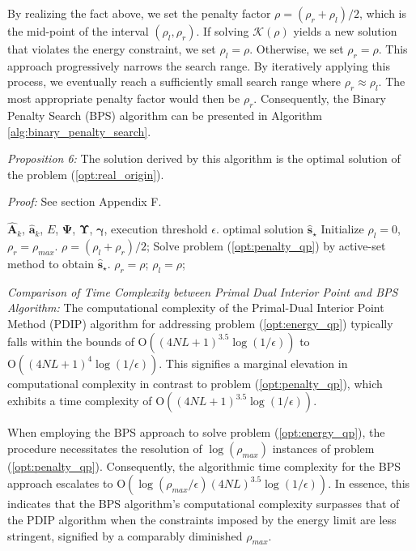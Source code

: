 \documentclass[lettersize,journal]{IEEEtran}
\newcommand{\nocolor}[1]{{\color{black}#1}}
\begin{document}
By realizing the fact above, we set the penalty factor $\rho = (\rho_r + \rho_l) / 2$, which is the mid-point of the interval $(\rho_l, \rho_r)$. If solving $\mathcal{K}(\rho)$ yields a new solution that violates the energy constraint, we set $\rho_l = \rho$. Otherwise, we set $\rho_r = \rho$. This approach progressively narrows the search range. By iteratively applying this process, we eventually reach a sufficiently small search range where $\rho_r \approx \rho_l$. The most appropriate penalty factor would then be $\rho_r$. Consequently, the Binary Penalty Search (BPS) algorithm can be presented in Algorithm \ref{alg:binary_penalty_search}.


\textit{Proposition 6:} The solution derived by this algorithm is the optimal solution of the problem (\ref{opt:real_origin}).

\textit{Proof:} \nocolor{See section Appendix F}.

\begin{algorithm}[htbp]
\caption{Binary Penalty Search}
\label{alg:binary_penalty_search}
\begin{algorithmic}[1]
    \REQUIRE $\hat{\mathbf{A}}_{k}$, $\hat{\mathbf{a}}_{k}$, $E$, $\mathbf{\Psi}$, $\mathbf{\Upsilon}$, $\bm{\gamma}$, execution threshold $\epsilon$.
    \ENSURE optimal solution $\hat{\mathbf{s}}_{\star}$
    \STATE Initialize $\rho_l=0$, $\rho_r=\rho_{max}$.
    \REPEAT
        \STATE $\rho=(\rho_l+\rho_r)/2$;
        \STATE Solve problem (\ref{opt:penalty_qp}) by active-set method to obtain $\hat{\mathbf{s}}_{\star}$.
            \STATE $\rho_r=\rho$;
        \ELSE
            \STATE $\rho_l=\rho$;
        \ENDIF
\end{algorithmic}
\end{algorithm}

\textit{Comparison of Time Complexity between Primal Dual Interior Point and BPS Algorithm:} The computational complexity of the Primal-Dual Interior Point Method (PDIP) algorithm for addressing problem (\ref{opt:energy_qp}) typically falls within the bounds of $\text{O}((4NL+1)^{3.5}\log(1/\epsilon))$ to $\text{O}((4NL+1)^4\log(1/\epsilon))$. This signifies a marginal elevation in computational complexity in contrast to problem (\ref{opt:penalty_qp}), which exhibits a time complexity of $\text{O}((4NL+1)^{3.5}\log(1/\epsilon))$.

When employing the BPS approach to solve problem (\ref{opt:energy_qp}), the procedure necessitates the resolution of $\log(\rho_{max})$ instances of problem (\ref{opt:penalty_qp}). Consequently, the algorithmic time complexity for the BPS approach escalates to $\text{O}(\log(\rho_{max}/\epsilon)(4NL)^{3.5}\log(1/\epsilon))$.
In essence, this indicates that the BPS algorithm's computational complexity surpasses that of the PDIP algorithm when the constraints imposed by the energy limit are less stringent, signified by a comparably diminished $\rho_{max}$.
\end{document}
